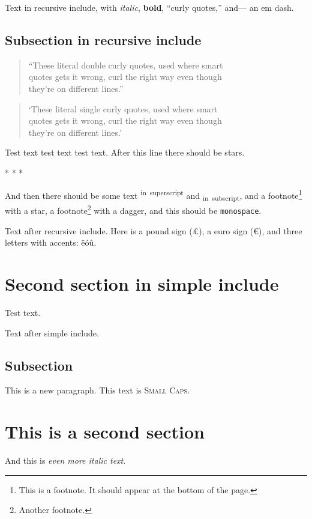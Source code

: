 \documentclass[
  12pt,
  a4paper,
]{article}
\begin{document}
Text in recursive include, with \emph{italic}, \textbf{bold}, ``curly
quotes,'' and--- an em dash.

\hypertarget{subsection-in-recursive-include}{%
\subsection{Subsection in recursive
include}\label{subsection-in-recursive-include}}

\begin{quote}
``These literal double curly quotes, used where smart\\
quotes gets it wrong, curl the right way even though\\
they're on different lines.''
\end{quote}

\begin{quote}
`These literal single curly quotes, used where smart\\
quotes gets it wrong, curl the right way even though\\
they're on different lines.'
\end{quote}

Test text test text test text. After this line there should be stars.

\begin{center}* * *\end{center}

And then there should be some text \textsuperscript{in~superscript} and
\textsubscript{in~subscript}, and a footnote\footnote{This is a
  footnote. It should appear at the bottom of the page.} with a star, a
footnote\footnote{Another footnote.} with a dagger, and this should be
\texttt{monospace}.

Text after recursive include. Here is a pound sign (£), a euro sign (€),
and three letters with accents: ëóû.

\hypertarget{second-section-in-simple-include}{%
\section{Second section in simple
include}\label{second-section-in-simple-include}}

Test text.

Text after simple include.

\hypertarget{subsection}{%
\subsection{Subsection}\label{subsection}}

This is a new paragraph. This text is \textsc{Small Caps}.

\hypertarget{this-is-a-second-section}{%
\section{This is a second section}\label{this-is-a-second-section}}

And this is \emph{even more italic text}.
\end{document}
